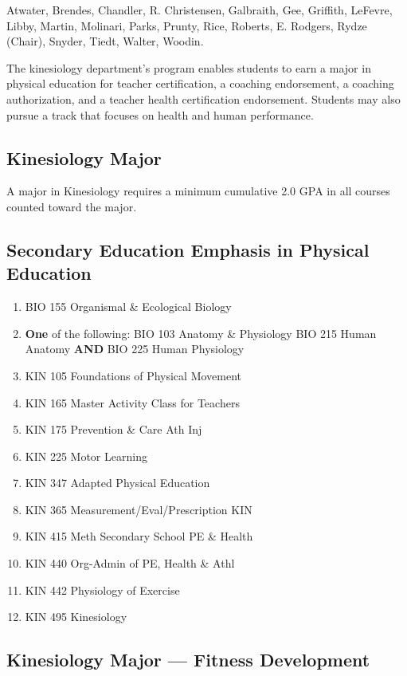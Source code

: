 \documentclass[
  letterpaper,
]{scrbook}
\providecommand{\tightlist}{%
  \setlength{\itemsep}{0pt}\setlength{\parskip}{0pt}}
\begin{document}
Atwater, Brendes, Chandler, R. Christensen, Galbraith, Gee, Griffith,
LeFevre, Libby, Martin, Molinari, Parks, Prunty, Rice, Roberts, E.
Rodgers, Rydze (Chair), Snyder, Tiedt, Walter, Woodin.

The kinesiology department's program enables students to earn a major in
physical education for teacher certification, a coaching endorsement, a
coaching authorization, and a teacher health certification endorsement.
Students may also pursue a track that focuses on health and human
performance.

\subsection{Kinesiology Major}\label{kinesiology-major}

A major in Kinesiology requires a minimum cumulative 2.0 GPA in all
courses counted toward the major.

\subsection{Secondary Education Emphasis in Physical
Education}\label{secondary-education-emphasis-in-physical-education}

\begin{enumerate}
\def\labelenumi{\arabic{enumi}.}
\tightlist
\item
  BIO 155 Organismal \& Ecological Biology
\item
  \textbf{One} of the following: BIO 103 Anatomy \& Physiology BIO 215
  Human Anatomy \textbf{AND} BIO 225 Human Physiology
\item
  KIN 105 Foundations of Physical Movement
\item
  KIN 165 Master Activity Class for Teachers
\item
  KIN 175 Prevention \& Care Ath Inj
\item
  KIN 225 Motor Learning
\item
  KIN 347 Adapted Physical Education
\item
  KIN 365 Measurement/Eval/Prescription KIN
\item
  KIN 415 Meth Secondary School PE \& Health
\item
  KIN 440 Org-Admin of PE, Health \& Athl
\item
  KIN 442 Physiology of Exercise
\item
  KIN 495 Kinesiology
\end{enumerate}

\subsection{Kinesiology Major --- Fitness
Development}\label{kinesiology-major-fitness-development}
\end{document}

